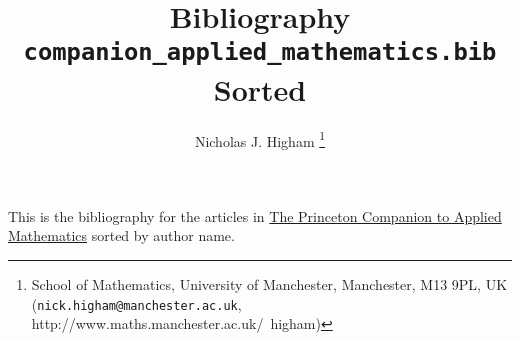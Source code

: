 \documentclass[12pt]{article}
\title{Bibliography \texttt{companion\_applied\_mathematics.bib} Sorted}
\author{Nicholas J. Higham%
        \thanks{%
                School of Mathematics,
                University of Manchester,
                Manchester, M13 9PL, UK 
                (\texttt{nick.higham@manchester.ac.uk},
                http://www.maths.manchester.ac.uk/\string~higham)
               }
}
\begin{document}
\maketitle

This is the bibliography for the articles in 
\href{http://www.ma.man.ac.uk/~higham/pcam/index.php}{The Princeton
  Companion to Applied Mathematics} \cite{higham15PCAM}
sorted by author name.

\nocite{*}



\end{document}
